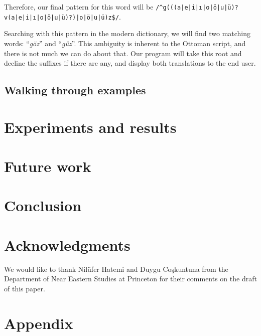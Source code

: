 \documentclass[10pt,twocolumn]{article}
\theoremstyle{nonumberplain}
\newcommand{\word}[1]{``\emph{#1}''}
\newcommand{\TODO}[1]{{\color{red}{[TODO: #1]}}}
\begin{document}
Therefore, our final pattern for this word will be
\texttt{/\^{}g(((a|e|i|ı|o|ö|u|ü)?v(a|e|i|ı|o|ö|u|ü)?)|o|ö|u|ü)z\$/}.

Searching with this pattern in the modern dictionary, we will find two matching
words: \word{göz} and \word{güz}. This ambiguity is inherent to the Ottoman
script, and there is not much we can do about that. Our program will take this
root and decline the suffixes if there are any, and display both translations
to the end user.

\subsection{Walking through examples}

\TODO{gotta write}

\section{Experiments and results}

\TODO{gotta write}

\section{Future work}

\TODO{gotta write}

\section{Conclusion}

\TODO{gotta write}

\section*{Acknowledgments}

We would like to thank Nilüfer Hatemi and Duygu Coşkuntuna
from the Department of Near Eastern Studies at Princeton
for their comments on the draft of this paper.




\clearpage
\appendix
\section{Appendix}

\end{document}
